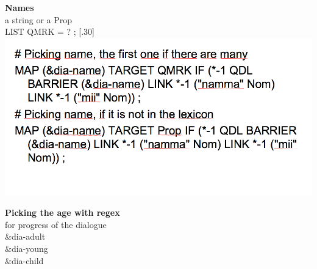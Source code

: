 \documentclass[landscape,norsk,11pt]{seminar}
\begin{document}
\begin{slide}
\newslide
\textbf{Names}\\
a string or a Prop \\ LIST QMRK = ? ; 
\scalebox{.30}[.30]{\includegraphics{img/picking_name.png}}

\newslide
\textbf{Picking the age with regex}\\
for progress of the dialogue \\

\&dia-adult \\
\&dia-young \\
\&dia-child









\end{slide}
\end{document}
